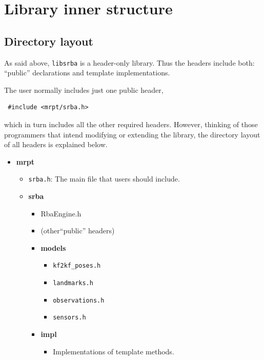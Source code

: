 \documentclass[a4paper,11pt]{article}
\begin{document}
\clearpage

\newpage
\section{Library inner structure}

\subsection{Directory layout}

As said above, \texttt{libsrba} is a header-only library. 
Thus the headers include both: ``public'' declarations and template implementations. 

The user normally includes just one public header,

\begin{lstlisting}
 #include <mrpt/srba.h>
\end{lstlisting}

\noindent which in turn includes all the other required headers. 
However, thinking of those programmers that intend modifying or extending the library, 
the directory layout of all headers is explained below. 

\begin{itemize}[label=$\rhd$]
  \item{\textbf{mrpt}
    \begin{itemize}[label=$\rhd$]
    \item{\texttt{srba.h}: The main file that users should include.}
    \item{\textbf{srba}
      \begin{itemize}[label=$\rhd$]
      \item{RbaEngine.h}
      \item{(other``public'' headers)}
      \item{\textbf{models}
	\begin{itemize}[label=$\rhd$]
	  \item \texttt{kf2kf\_poses.h}
	  \item \texttt{landmarks.h}
	  \item \texttt{observations.h}
	  \item \texttt{sensors.h}
	\end{itemize}
      }
      \item{\textbf{impl}
	\begin{itemize}[label=$\rhd$]
	\item Implementations of template methods.
	\end{itemize}
	}
      \end{itemize}
    }
    \end{itemize}
  }
\end{itemize}
\end{document}
